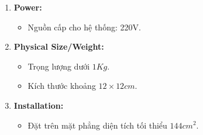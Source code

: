 \begin{enumerate}[label=\alph*)]
	\item \textbf{Power:}
	\begin{itemize}[label=-]
		\item Nguồn cấp cho hệ thống: 220V.
	\end{itemize}
	\item \textbf{Physical Size/Weight:}
	\begin{itemize}[label=-]
		\item Trọng lượng dưới $1Kg$.
		\item Kích thước khoảng $12\times12cm$.
	\end{itemize}
	\item \textbf{Installation:}
	\begin{itemize}[label=-]
		\item Đặt trên mặt phẳng diện tích tối thiểu $144 cm^2$.
	\end{itemize}
\end{enumerate}

